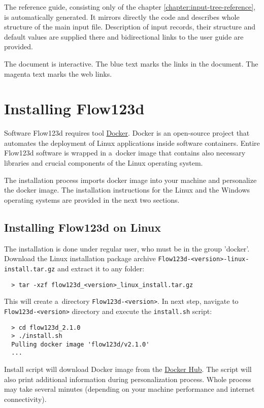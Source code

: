 The reference guide, consisting only of the chapter \ref{chapter:input-tree-reference}, is automatically
generated. It mirrors directly the code and describes whole structure of the main input file. Description
of input records, their structure and default values are supplied there and bidirectional links to the user 
guide are provided.

The document is interactive. The blue text marks the links in the document. The magenta text marks the web links.




\section{Installing Flow123d}
Software Flow123d requires tool \href{https://www.docker.com}{Docker}. 
Docker is an open-source project that automates the deployment of Linux applications inside software containers. 
Entire Flow123d software is wrapped in a~docker image that contains also necessary libraries and crucial components 
of the Linux operating system.

The installation process imports docker image into your machine and personalize the docker image. The installation 
instructions for the Linux and the Windows operating systems are provided in the next two sections.


\subsection{Installing Flow123d on Linux}
The installation is done under regular user, who must be in the group 'docker'.
Download the Linux installation package archive \verb'Flow123d-<version>-linux-install.tar.gz' and extract it to any folder:
\begin{verbatim}
  > tar -xzf flow123d_<version>_linux_install.tar.gz
\end{verbatim}
This will create a~directory \verb'Flow123d-<version>'. In next step, navigate to \verb'Flow123d-<version>' directory
and execute the \verb'install.sh' script:
\begin{verbatim}
  > cd flow123d_2.1.0
  > ./install.sh
  Pulling docker image 'flow123d/v2.1.0'
  ...
\end{verbatim}
Install script will download Docker image from the \href{https://hub.docker.com/u/flow123d}{Docker Hub}. The script will also print
additional information during personalization process. Whole process may take several minutes (depending on your machine performance and internet connectivity).


